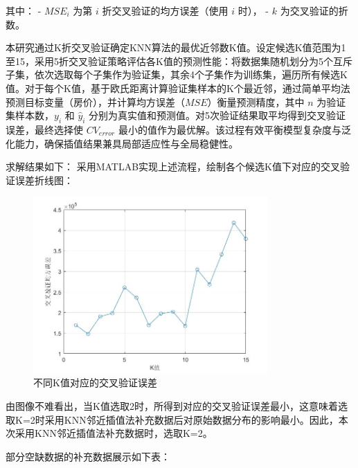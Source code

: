 \documentclass[12pt]{article}
\begin{document}
\begin{CJK}{UTF8}{gbsn}
\begin{enumerate}
		其中：
		- \( MSE_i \) 为第 \( i \) 折交叉验证的均方误差（使用 \( i \) 时），
		- \( k \) 为交叉验证的折数。
		
		本研究通过K折交叉验证确定KNN算法的最优近邻数K值。设定候选K值范围为1至15，采用5折交叉验证策略评估各K值的预测性能：将数据集随机划分为5个互斥子集，依次选取每个子集作为验证集，其余4个子集作为训练集，遍历所有候选K值。对于每个K值，基于欧氏距离计算验证集样本的K个最近邻，通过简单平均法预测目标变量（房价），并计算均方误差（\( MSE \)）衡量预测精度，其中 \( n \) 为验证集样本数，\( y_i \) 和 \( \hat{y}_i \) 分别为真实值和预测值。对5次验证结果取平均得到交叉验证误差，最终选择使 \( CV_{error} \) 最小的值作为最优解。该过程有效平衡模型复杂度与泛化能力，确保插值结果兼具局部适应性与全局稳健性。
		
		求解结果如下：
		采用MATLAB实现上述流程，绘制各个候选K值下对应的交叉验证误差折线图：
	\end{enumerate}
	
		\begin{figure}[htbp]
		\centering
		\includegraphics[width=0.8\textwidth]{pic/1.jpg} %
		\caption{不同K值对应的交叉验证误差}
		\label{fig:1}
	\end{figure}
	
	由图像不难看出，当K值选取2时，所得到对应的交叉验证误差最小，这意味着选取K=2时采用KNN邻近插值法补充数据后对原始数据分布的影响最小。因此，本次采用KNN邻近插值法补充数据时，选取K=2。
	
	部分空缺数据的补充数据展示如下表：
	

\end{CJK}
\end{document}
